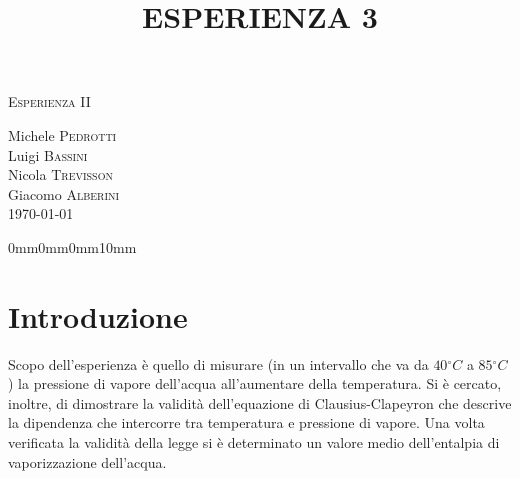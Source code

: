 \documentclass[11pt]{article}
\begin{document}
\begin{center}



\textsc{\Huge Esperienza II}\\[0.5cm]



\large
\title{ESPERIENZA 3}

Michele \textsc{Pedrotti}\\
Luigi \textsc{Bassini}\\
Nicola \textsc{Trevisson}\\
Giacomo \textsc{Alberini}
\\
\vspace{10pt}
\today





\end{center}

\setmarginsrb{30mm}{10mm}{25mm}{10mm}%
             {0mm}{0mm}{0mm}{10mm}


\section{Introduzione}
Scopo dell'esperienza è quello di misurare (in un intervallo che va da $40\ensuremath{^\circ}C$ a $85\ensuremath{^\circ}C$) la pressione di vapore dell'acqua all'aumentare della temperatura. Si è cercato, inoltre, di dimostrare la validità dell'equazione di Clausius-Clapeyron che descrive la dipendenza che intercorre tra temperatura e pressione di vapore.
Una volta verificata la validità della legge si è determinato un valore medio dell'entalpia di vaporizzazione dell'acqua.
\end{document}
